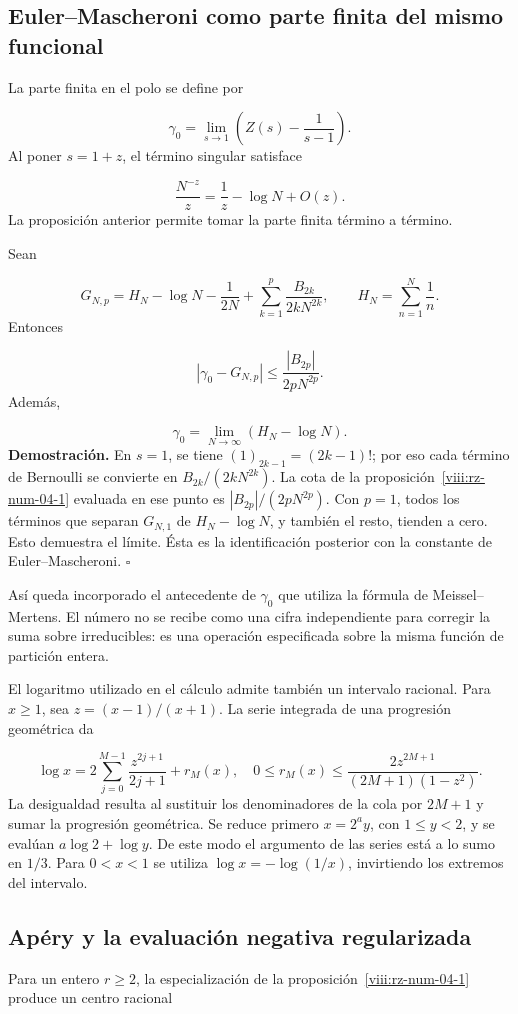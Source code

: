 \subsection{Euler–Mascheroni como parte finita del mismo funcional}
La parte finita en el polo se define por

\[
\gamma_0=\lim_{s\to1}\left(Z(s)-\frac1{s-1}\right).
\]
Al poner \(s=1+z\), el término singular satisface

\[
\frac{N^{-z}}z=\frac1z-\log N+O(z).
\]
La proposición anterior permite tomar la parte finita término a término.

Sean

\[
G_{N,p}=H_N-\log N-\frac1{2N}
+\sum_{k=1}^p\frac{B_{2k}}{2kN^{2k}},
\qquad H_N=\sum_{n=1}^N\frac1n.
\]
Entonces

\[
|\gamma_0-G_{N,p}|\leq\frac{|B_{2p}|}{2pN^{2p}}.
\]
Además,

\[
\gamma_0=\lim_{N\to\infty}(H_N-\log N).
\]
\textbf{Demostración.} En \(s=1\), se tiene \((1)_{2k-1}=(2k-1)!\); por eso cada término de Bernoulli se convierte en \(B_{2k}/(2kN^{2k})\). La cota de la proposición~\ref{viii:rz-num-04-1} evaluada en ese punto es \(|B_{2p}|/(2pN^{2p})\). Con \(p=1\), todos los términos que separan \(G_{N,1}\) de \(H_N-\log N\), y también el resto, tienden a cero. Esto demuestra el límite. Ésta es la identificación posterior con la constante de Euler–Mascheroni. \hfill\(\square\)

Así queda incorporado el antecedente de \(\gamma_0\) que utiliza la fórmula de Meissel–Mertens. El número no se recibe como una cifra independiente para corregir la suma sobre irreducibles: es una operación especificada sobre la misma función de partición entera.

El logaritmo utilizado en el cálculo admite también un intervalo racional. Para \(x\geq1\), sea \(z=(x-1)/(x+1)\). La serie integrada de una progresión geométrica da

\[
\log x=2\sum_{j=0}^{M-1}\frac{z^{2j+1}}{2j+1}+r_M(x),
\quad
0\leq r_M(x)\leq
\frac{2z^{2M+1}}{(2M+1)(1-z^2)}.
\]
La desigualdad resulta al sustituir los denominadores de la cola por \(2M+1\) y sumar la progresión geométrica. Se reduce primero \(x=2^a y\), con \(1\leq y<2\), y se evalúan \(a\log2+\log y\). De este modo el argumento de las series está a lo sumo en \(1/3\). Para \(0<x<1\) se utiliza \(\log x=-\log(1/x)\), invirtiendo los extremos del intervalo.

\subsection{Apéry y la evaluación negativa regularizada}
Para un entero \(r\geq2\), la especialización de la proposición~\ref{viii:rz-num-04-1} produce un centro racional

